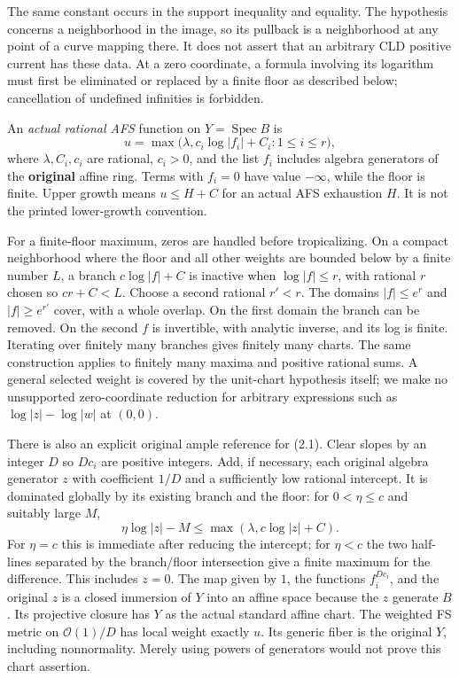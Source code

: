 \documentclass[
  10pt,
]{article}
\begin{document}
The same constant occurs in the support inequality and equality. The
hypothesis concerns a neighborhood in the image, so its pullback is a
neighborhood at any point of a curve mapping there. It does not assert
that an arbitrary CLD positive current has these data. At a zero
coordinate, a formula involving its logarithm must first be eliminated
or replaced by a finite floor as described below; cancellation of
undefined infinities is forbidden.

An \emph{actual rational AFS} function on \(Y=\operatorname{Spec}B\) is
\[u=\max\bigl(\lambda,c_i\log|f_i|+C_i:1\le i\le r\bigr),\tag{2.1}\]
where \(\lambda,C_i,c_i\) are rational, \(c_i>0\), and the list \(f_i\)
includes algebra generators of the \textbf{original} affine ring. Terms
with \(f_i=0\) have value \(-\infty\), while the floor is finite. Upper
growth means \(u\le H+C\) for an actual AFS exhaustion \(H\). It is not
the printed lower-growth convention.

For a finite-floor maximum, zeros are handled before tropicalizing. On a
compact neighborhood where the floor and all other weights are bounded
below by a finite number \(L\), a branch \(c\log|f|+C\) is inactive when
\(\log|f|\le r\), with rational \(r\) chosen so \(cr+C<L\). Choose a
second rational \(r'<r\). The domains \(|f|\le e^r\) and
\(|f|\ge e^{r'}\) cover, with a whole overlap. On the first domain the
branch can be removed. On the second \(f\) is invertible, with analytic
inverse, and its log is finite. Iterating over finitely many branches
gives finitely many charts. The same construction applies to finitely
many maxima and positive rational sums. A general selected weight is
covered by the unit-chart hypothesis itself; we make no unsupported
zero-coordinate reduction for arbitrary expressions such as
\(\log|z|-\log|w|\) at \((0,0)\).

There is also an explicit original ample reference for (2.1). Clear
slopes by an integer \(D\) so \(Dc_i\) are positive integers. Add, if
necessary, each original algebra generator \(z\) with coefficient
\(1/D\) and a sufficiently low rational intercept. It is dominated
globally by its existing branch and the floor: for \(0<\eta\le c\) and
suitably large \(M\),
\[\eta\log|z|-M\le\max(\lambda,c\log|z|+C).\tag{2.2}\] For \(\eta=c\)
this is immediate after reducing the intercept; for \(\eta<c\) the two
half-lines separated by the branch/floor intersection give a finite
maximum for the difference. This includes \(z=0\). The map given by
\(1\), the functions \(f_i^{Dc_i}\), and the original \(z\) is a closed
immersion of \(Y\) into an affine space because the \(z\) generate
\(B\). Its projective closure has \(Y\) as the actual standard affine
chart. The weighted FS metric on \(\mathcal O(1)/D\) has local weight
exactly \(u\). Its generic fiber is the original \(Y\), including
nonnormality. Merely using powers of generators would not prove this
chart assertion.
\end{document}
